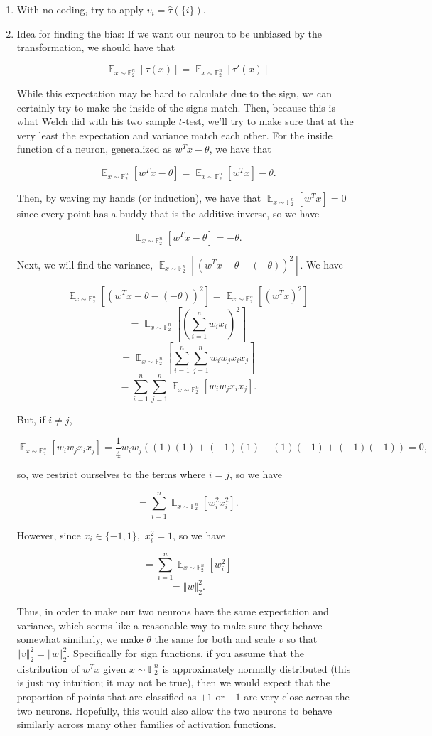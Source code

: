 \documentclass{article}
\newcommand{\bF}{\mathbb{F}}
\newcommand{\norm}[1]{\left\Vert #1 \right\Vert}
\DeclareMathOperator{\E}{\mathbb{E}}
\begin{document}
\begin{enumerate}

\item With no coding, try to apply $v_i = \hat\tau(\{i\})$.

\item Idea for finding the bias: If we want our neuron to be unbiased by the transformation, we should have that

$$\E_{x\sim\bF_2^n}[\tau(x)] = \E_{x \sim \bF_2^n}[\tau'(x)]$$

While this expectation may be hard to calculate due to the sign, we can certainly try to make the inside of the signs match. Then, because this is what Welch did with his two sample $t$-test, we'll try to make sure that at the very least the expectation and variance match each other. For the inside function of a neuron, generalized as $w^T x - \theta$, we have that

$$\E_{x \sim \bF_2^n} [w^T x - \theta] = \E_{x \sim \bF_2^n} [w^T x] - \theta.$$

Then, by waving my hands (or induction), we have that $\E_{x \sim \bF_2^n} [w^T x] = 0$ since every point has a buddy that is the additive inverse, so we have

$$\E_{x \sim \bF_2^n} [w^T x - \theta] = - \theta.$$

Next, we will find the variance, $\E_{x \sim \bF_2^n} [(w^T x - \theta - (-\theta))^2].$ We have

$$\E_{x \sim \bF_2^n} [(w^T x - \theta - (-\theta))^2]
= \E_{x \sim \bF_2^n} [(w^T x)^2]$$
$$ = \E_{x \sim \bF_2^n} \left[ \left( \sum_{i=1}^n w_i x_i \right)^2 \right]$$
$$ = \E_{x \sim \bF_2^n} \left[ \sum_{i=1}^n \sum_{j=1}^n w_i w_j x_i x_j\right]$$
$$ = \sum_{i=1}^n \sum_{j=1}^n \E_{x \sim \bF_2^n}[w_i w_j x_i x_j].$$

But, if $i \ne j$,

$$\E_{x \sim \bF_2^n}[w_i w_j x_i x_j]
= \frac{1}{4}w_i w_j\left((1)(1) + (-1)(1) + (1)(-1) + (-1)(-1)\right) = 0,$$

so, we restrict ourselves to the terms where $i = j$, so we have

$$ = \sum_{i=1}^n \E_{x \sim \bF_2^n}[w_i^2 x_i^2].$$

However, since $x_i \in \{-1, 1\},$ $x_i^2 = 1$, so we have

$$ = \sum_{i=1}^n \E_{x \sim \bF_2^n}[w_i^2]$$
$$ = \norm{w}_2^2.$$

Thus, in order to make our two neurons have the same expectation and variance, which seems like a reasonable way to make sure they behave somewhat similarly, we make $\theta$ the same for both and scale $v$ so that $\norm{v}_2^2 = \norm{w}_2^2$. Specifically for sign functions, if you assume that the distribution of $w^Tx$ given $x \sim \bF_2^n$ is approximately normally distributed (this is just my intuition; it may not be true), then we would expect that the proportion of points that are classified as $+1$ or $-1$ are very close across the two neurons. Hopefully, this would also allow the two neurons to behave similarly across many other families of activation functions.


\end{enumerate}
\end{document}
